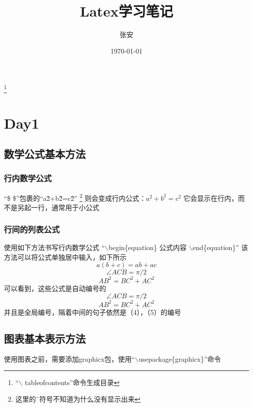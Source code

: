 \documentclass[UTF8]{ctexbook}
\title{Latex学习笔记}
\author{张安}
\date{\today}
\begin{document}
  \maketitle

  \tableofcontents\footnote{“$\backslash$ tableofcontents”命令生成目录}
  \newpage
\chapter{Day1}

\section{数学公式基本方法}

\subsection{行内数学公式}
“\$ \$”包裹的“a\^2+b\^2=c\^2”
\footnote{这里的\^\ 符号不知道为什么没有显示出来}
则会变成行内公式：$a^2+b^2=c^2$
\newline
它会显示在行内，而不是另起一行，通常用于小公式

\subsection{行间的列表公式}
使用如下方法书写行内数学公式 \newline
“$\backslash$begin\{equation\} \newline 公式内容 \newline$\backslash$end\{equation\}”
\newline
该方法可以将公式单独居中输入，如下所示
\begin{equation}
  a(b+c) = ab + ac
\end{equation}
\begin{equation}
  \angle ACB = \pi / 2
\end{equation}
\begin{equation}\label{eq:gougu}
  AB^2 = BC^2 + AC^2
\end{equation}
可以看到，这些公式是自动编号的
\begin{equation}
  \angle ACB = \pi / 2
\end{equation}
\begin{equation}
  AB^2 = BC^2 + AC^2
\end{equation}
并且是全局编号，隔着中间的句子依然是（4），（5）的编号

\section{图表基本表示方法}
使用图表之前，需要添加graphicx包，使用“$\backslash$usepackage\{graphicx\}”命令
\end{document}
